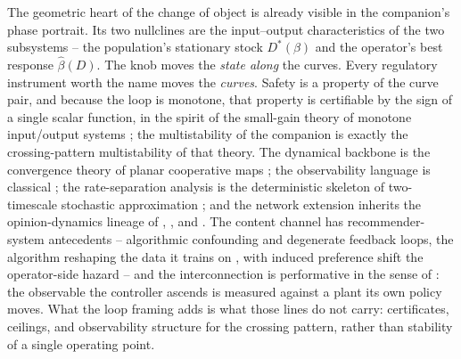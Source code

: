 \documentclass[11pt]{article}
\theoremstyle{definition}
\theoremstyle{remark}
\numberwithin{equation}{section}
\begin{document}
The geometric heart of the change of object is already visible in the companion's phase portrait. Its two nullclines are the input--output characteristics of the two subsystems -- the population's stationary stock $D^\ast(\beta)$ and the operator's best response $\hat\beta(D)$. The knob moves the \emph{state along} the curves. Every regulatory instrument worth the name moves the \emph{curves}. Safety is a property of the curve pair, and because the loop is monotone, that property is certifiable by the sign of a single scalar function, in the spirit of the small-gain theory of monotone input/output systems \citep{angeli2003monotone,angeli2004multi}; the multistability of the companion is exactly the crossing-pattern multistability of that theory. The dynamical backbone is the convergence theory of planar cooperative maps \citep{smith1998planar,hirsch2006monotone}; the observability language is classical \citep{sontag1998mathematical}; the rate-separation analysis is the deterministic skeleton of two-timescale stochastic approximation \citep{borkar1997stochastic,borkar2008stochastic}; and the network extension inherits the opinion-dynamics lineage of \citet{degroot1974reaching}, \citet{friedkin1990social}, and \citet{golub2010naive}. The content channel has recommender-system antecedents -- algorithmic confounding and degenerate feedback loops, the algorithm reshaping the data it trains on \citep{chaney2018algorithmic, jiang2019degenerate}, with induced preference shift the operator-side hazard \citep{carroll2022estimating} -- and the interconnection is performative in the sense of \citet{perdomo2020performative}: the observable the controller ascends is measured against a plant its own policy moves. What the loop framing adds is what those lines do not carry: certificates, ceilings, and observability structure for the crossing pattern, rather than stability of a single operating point.
\end{document}
